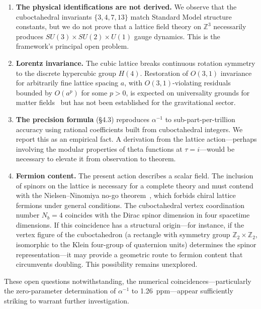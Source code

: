 \documentclass[12pt,a4paper]{article}
\begin{document}
\begin{enumerate}
\item \textbf{The physical identifications are not derived.} We observe that the cuboctahedral invariants $\{3, 4, 7, 13\}$ match Standard Model structure constants, but we do not prove that a lattice field theory on $\mathbb{Z}^{3}$ necessarily produces $SU(3) \times SU(2) \times U(1)$ gauge dynamics. This is the framework's principal open problem.

\item \textbf{Lorentz invariance.} The cubic lattice breaks continuous rotation symmetry to the discrete hypercubic group $H(4)$. Restoration of $O(3,1)$ invariance for arbitrarily fine lattice spacing $a$, with $O(3,1)$-violating residuals bounded by $O(a^{p})$ for some $p > 0$, is expected on universality grounds for matter fields~\cite{Wilson} but has not been established for the gravitational sector.

\item \textbf{The precision formula} (\S4.3) reproduces $\alpha^{-1}$ to sub-part-per-trillion accuracy using rational coefficients built from cuboctahedral integers. We report this as an empirical fact. A derivation from the lattice action---perhaps involving the modular properties of theta functions at $\tau = i$---would be necessary to elevate it from observation to theorem.

\item \textbf{Fermion content.} The present action describes a scalar field. The inclusion of spinors on the lattice is necessary for a complete theory and must contend with the Nielsen--Ninomiya no-go theorem~\cite{NielsenNinomiya}, which forbids chiral lattice fermions under general conditions. The cuboctahedral vertex coordination number $N_{b} = 4$ coincides with the Dirac spinor dimension in four spacetime dimensions. If this coincidence has a structural origin---for instance, if the vertex figure of the cuboctahedron (a rectangle with symmetry group $\mathbb{Z}_{2} \times \mathbb{Z}_{2}$, isomorphic to the Klein four-group of quaternion units) determines the spinor representation---it may provide a geometric route to fermion content that circumvents doubling. This possibility remains unexplored.
\end{enumerate}

These open questions notwithstanding, the numerical coincidences---particularly the zero-parameter determination of $\alpha^{-1}$ to 1.26~ppm---appear sufficiently striking to warrant further investigation.
\end{document}
